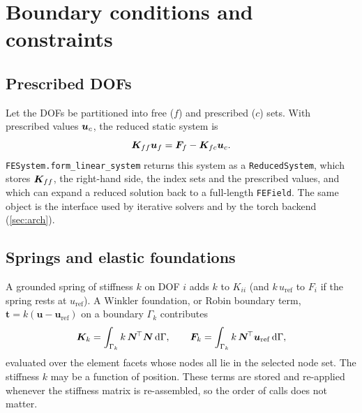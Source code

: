 \section{Boundary conditions and constraints}\label{sec:constraints}

\subsection{Prescribed DOFs}
Let the DOFs be partitioned into free ($f$) and prescribed ($c$) sets. With prescribed values $\bm{u}_c$, the reduced static system is
\begin{equation}
  \bm{K}_{ff}\bm{u}_f=\bm{F}_f-\bm{K}_{fc}\bm{u}_c .
  \label{eq:dirichlet}
\end{equation}
\texttt{FESystem.form\_linear\_system} returns this system as a \texttt{ReducedSystem}, which stores $\bm{K}_{ff}$, the right-hand side, the index sets and the prescribed values,
and which can expand a reduced solution back to a full-length \texttt{FEField}. The same object is the interface used by iterative solvers and by the torch backend (\cref{sec:arch}).

\subsection{Springs and elastic foundations}
A grounded spring of stiffness $k$ on DOF $i$ adds $k$ to $K_{ii}$ (and $k\,u_{\mathrm{ref}}$ to $F_i$ if the spring rests at $u_{\mathrm{ref}}$). A Winkler foundation, or Robin boundary term,
$\bm t=k(\bm u-\bm u_{\mathrm{ref}})$ on a boundary $\Gamma_k$ contributes
\begin{equation}
  \bm{K}_k=\int_{\Gamma_k}k\,\bm N^{\!\top}\bm N\,\mathrm d\Gamma,\qquad
  \bm{F}_k=\int_{\Gamma_k}k\,\bm N^{\!\top}\bm u_{\mathrm{ref}}\,\mathrm d\Gamma,
  \label{eq:robin}
\end{equation}
evaluated over the element facets whose nodes all lie in the selected node set. The stiffness $k$ may be a function of position. These terms are stored and re-applied whenever
the stiffness matrix is re-assembled, so the order of calls does not matter.

